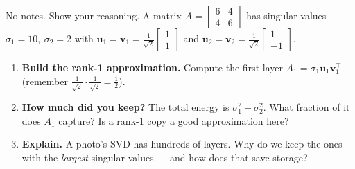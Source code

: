\documentclass[10pt]{article}
\newcommand{\uu}{\mathbf{u}}
\newcommand{\vv}{\mathbf{v}}
\newcommand{\T}{^{\top}}
\begin{document}
\namedateperiod

\vspace{0.15in}

No notes. Show your reasoning. A matrix $A=\begin{bmatrix} 6 & 4\\ 4 & 6 \end{bmatrix}$ has singular values
$\sigma_1=10,\ \sigma_2=2$ with $\uu_1=\vv_1=\tfrac1{\sqrt2}\begin{bmatrix} 1\\1 \end{bmatrix}$ and
$\uu_2=\vv_2=\tfrac1{\sqrt2}\begin{bmatrix} 1\\-1 \end{bmatrix}$.

\begin{enumerate}[leftmargin=1.8em, itemsep=15pt]
  \item \textbf{Build the rank-1 approximation.} Compute the first layer $A_1=\sigma_1\uu_1\vv_1\T$ (remember $\tfrac1{\sqrt2}\cdot\tfrac1{\sqrt2}=\tfrac12$).
        \vspace{1.7cm}
  \item \textbf{How much did you keep?} The total energy is $\sigma_1^2+\sigma_2^2$. What fraction of it does $A_1$ capture? Is a rank-1 copy a good approximation here?
        \vspace{1.7cm}
  \item \textbf{Explain.} A photo's SVD has hundreds of layers. Why do we keep the ones with the \emph{largest} singular values --- and how does that save storage? 
\end{enumerate}
\end{document}
